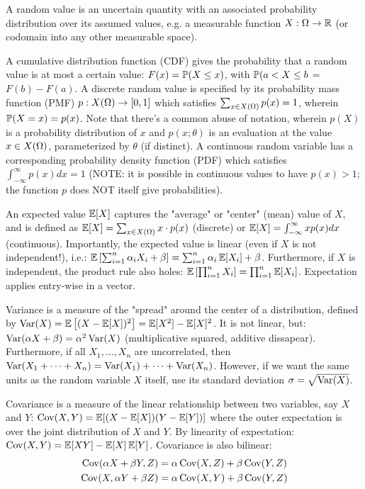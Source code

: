 \documentclass{article}
\begin{document}
\begin{solution}
    A random value is an uncertain quantity with an associated probability distribution over its assumed values, e.g. a measurable function $X : \Omega \to \mathbb{R}$ (or codomain into any other measurable space).
    
    A cumulative distribution function (CDF) gives the probability that a random value is at most a certain value: $F(x) = \operatorname{\mathbb{P}}(X \leq x)$, with $\operatorname{\mathbb{P}}(a < X \leq b$ = $F(b) - F(a)$. A discrete random value is specified by its probability mass function (PMF) $p : X(\Omega) \to [0,1]$ which satisfies $\sum_{x \in X(\Omega)} p(x) = 1$, wherein $\operatorname{\mathbb{P}}(X = x) = p(x)$. Note that there's a common abuse of notation, wherein $p(X)$ is a probability distribution of $x$ and $p(x; \theta)$ is an evaluation at the value $x \in X(\Omega)$, parameterized by $\theta$ (if distinct). A continuous random variable has a corresponding probability density function (PDF) which satisfies $\int_{-\infty}^{\infty} p(x) dx = 1$ (NOTE: it is possible in continuous values to have $p(x) > 1$; the function $p$ does NOT itself give probabilities).

    An expected value $\operatorname{\mathbb{E}}[X]$ captures the "average" or "center" (mean) value of $X$, and is defined as $\operatorname{\mathbb{E}}[X] = \sum_{x \in X(\Omega)} x \cdot p(x)$ (discrete) or $\operatorname{\mathbb{E}}[X] = \int_{-\infty}^{\infty} x p(x) dx$ (continuous). Importantly, the expected value is linear (even if $X$ is not independent!), i.e.: $\operatorname{\mathbb{E}}\left[\sum_{i=1}^n \alpha_i X_i + \beta \right] = \sum_{i=1}^n \alpha_i \operatorname{\mathbb{E}}[X_i] + \beta$. Furthermore, if $X$ is independent, the product rule also holes: $\operatorname{\mathbb{E}}\left[\prod_{i=1}^n X_i\right] = \prod_{i=1}^n \operatorname{\mathbb{E}}[X_i]$. Expectation applies entry-wise in a vector.

    Variance is a measure of the "spread" around the center of a distribution, defined by $\operatorname{Var}(X) = \operatorname{\mathbb{E}}\left[(X-\operatorname{\mathbb{E}}[X])^2\right] = \operatorname{\mathbb{E}}[X^2] - \operatorname{\mathbb{E}}[X]^2$. It is not linear, but: $\operatorname{Var}(\alpha X + \beta) = \alpha^2 \operatorname{Var}(X)$ (multiplicative squared, additive dissapear). Furthermore, if all $X_1, \ldots, X_n$ are uncorrelated, then $\operatorname{Var}(X_1 + \cdots + X_n) = \operatorname{Var}(X_1) + \cdots + \operatorname{Var}(X_n)$. However, if we want the same units as the random variable $X$ itself, use its standard deviation $\sigma = \sqrt{\operatorname{Var}(X)}$.

    Covariance is a measure of the linear relationship between two variables, say $X$ and $Y$: $\operatorname{Cov}(X,Y) = \operatorname{\mathbb{E}}[(X - \operatorname{\mathbb{E}}[X])(Y - \operatorname{\mathbb{E}}[Y])]$ where the outer expectation is over the joint distribution of $X$ and $Y$. By linearity of expectation: $\operatorname{Cov}(X, Y) = \operatorname{\mathbb{E}}[XY] - \operatorname{\mathbb{E}}[X]\operatorname{\mathbb{E}}[Y]$. Covariance is also bilinear:
    \begin{align*}
    \operatorname{Cov}(\alpha X + \beta Y, Z) &= \alpha\operatorname{Cov}(X, Z) + \beta\operatorname{Cov}(Y,Z)\\
    \operatorname{Cov}(X, \alpha Y + \beta Z) &= \alpha\operatorname{Cov}(X, Y) + \beta\operatorname{Cov}(Y,Z)
    \end{align*}


\end{solution}
\end{document}
